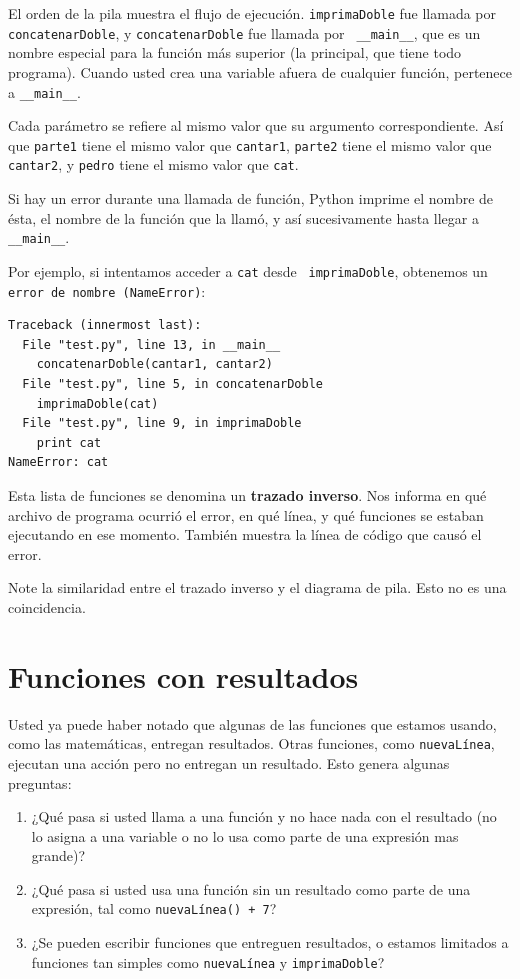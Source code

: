 El orden de la pila muestra el flujo  de ejecución.  \texttt{imprimaDoble}
fue llamada por \texttt{concatenarDoble}, y \texttt{concatenarDoble} fue llamada por {\tt
\_\_main\_\_}, que es un nombre especial para la función más superior (la principal, que tiene todo programa). Cuando usted crea una variable afuera de cualquier función,
pertenece a {\tt\_\_main\_\_}.

Cada parámetro se refiere al mismo valor que su argumento correspondiente. Así que \texttt{parte1} tiene el mismo valor que \texttt{cantar1}, \texttt{parte2} tiene el mismo valor que \texttt{cantar2}, y \texttt{pedro} tiene el mismo valor que  \texttt{cat}.

Si hay un error durante una llamada de función, Python imprime el nombre de ésta, el
nombre de la función que la llamó, y así sucesivamente hasta llegar a \texttt{\_\_main\_\_}.

Por ejemplo, si intentamos acceder a  \texttt{cat} desde {\tt
imprimaDoble}, obtenemos un \texttt{error de nombre (NameError)}:

\beforeverb
\begin{verbatim}
Traceback (innermost last):
  File "test.py", line 13, in __main__
    concatenarDoble(cantar1, cantar2)
  File "test.py", line 5, in concatenarDoble
    imprimaDoble(cat)
  File "test.py", line 9, in imprimaDoble
    print cat
NameError: cat
\end{verbatim}
\afterverb
%
Esta lista de funciones se denomina un {\bf trazado inverso}. Nos informa
en qué archivo de programa ocurrió el error, en qué línea, y qué funciones
se estaban ejecutando en ese momento. También muestra la línea de código que
causó el error.


Note la similaridad entre el trazado inverso y el diagrama de pila. Esto no 
es una coincidencia.


\section{Funciones con resultados}

Usted ya puede haber notado que algunas de las funciones que estamos usando,
como las matemáticas, entregan resultados. Otras funciones, como \texttt{nuevaLínea}, 
ejecutan una acción pero no entregan un resultado. Esto genera algunas preguntas:

\begin{enumerate}

\item ¿Qué pasa si usted llama a una función y no hace nada con el resultado (no lo 
asigna a una variable o no lo usa como parte de una expresión mas grande)?

\item ¿Qué pasa si usted usa una función sin un resultado como parte de 
una expresión, tal como  \texttt{nuevaLínea() + 7}?

\item ¿Se pueden escribir funciones que entreguen resultados, o estamos limitados
a funciones tan simples como \texttt{nuevaLínea} y \texttt{imprimaDoble}?

\end{enumerate}


